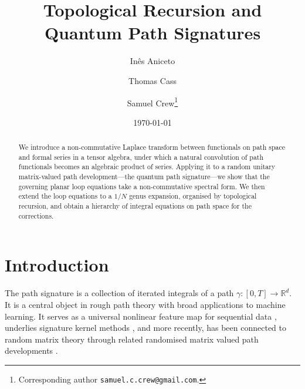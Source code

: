 \documentclass[11pt,a4paper]{article}
\title{Topological Recursion and Quantum Path Signatures}
\author[1]{In\^es Aniceto}
\author[2]{Thomas Cass}
\author[3]{Samuel Crew\thanks{Corresponding author  \texttt{samuel.c.crew@gmail.com}.}}
\affil[1]{School of Mathematical Sciences, University of Southampton, UK}
\affil[2]{Department of Mathematics, Imperial College
London, UK}
\affil[3]{QPerfect, Strasbourg, France}
\date{\today}
\begin{document}
\maketitle

\begin{abstract}
We introduce a non-commutative Laplace transform between functionals on path space and formal series in a tensor algebra, under which a natural convolution of path functionals becomes an algebraic product of series. Applying it to a random unitary matrix-valued path development---the quantum path signature---we show that the governing planar loop equations take a non-commutative spectral form. We then extend the loop equations to a $1/N$ genus expansion, organised by topological recursion, and obtain a hierarchy of integral equations on path space for the corrections.
\end{abstract}


\section{Introduction}\label{sec:intro}


The path signature \cite{chen1954iterated,lyons2007differential} is a collection of iterated integrals of a path $\gamma\colon[0,T]\to\mathbb{R}^d$. It is a central object in rough path theory \cite{lyons1998differential} with broad applications to machine learning. It serves as a universal nonlinear feature map for sequential data \cite{kidger2019deep,yang2022developing}, underlies signature kernel methods \cite{kiraly2019kernels,salvi2021signature}, and more recently, has been connected to random matrix theory through related randomised matrix valued path developments \cite{lou2023pcf,cirone2023neural,cass2026free,crew2025quantum}.
\end{document}
